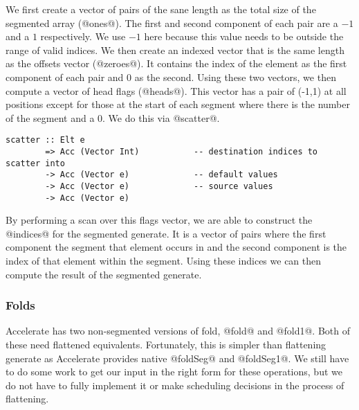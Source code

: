 We first create a vector of pairs of the sane length as the total size of the segmented array (@ones@). The first and second component of each pair are a $-1$ and a $1$ respectively. We use $-1$ here because this value needs to be outside the range of valid indices. We then create an indexed vector that is the same length as the offsets vector (@zeroes@). It contains the index of the element as the first component of each pair and 0 as the second. Using these two vectors, we then compute a vector of head flags (@heads@). This vector has a pair of (-1,1) at all positions except for those at the start of each segment where there is the number of the segment and a 0. We do this via @scatter@.
%
\begin{lstlisting}
scatter :: Elt e
        => Acc (Vector Int)           -- destination indices to scatter into
        -> Acc (Vector e)             -- default values
        -> Acc (Vector e)             -- source values
        -> Acc (Vector e)
\end{lstlisting}
%
By performing a scan over this flags vector, we are able to construct the @indices@ for the segmented generate. It is a vector of pairs where the first component the segment that element occurs in and the second component is the index of that element within the segment. Using these indices we can then compute the result of the segmented generate.

\subsubsection{Folds}
Accelerate has two non-segmented versions of fold, @fold@ and @fold1@. Both of these need flattened equivalents. Fortunately, this is simpler than flattening generate as Accelerate provides native @foldSeg@ and @foldSeg1@. We still have to do some work to get our input in the right form for these operations, but we do not have to fully implement it or make scheduling decisions in the process of flattening.

